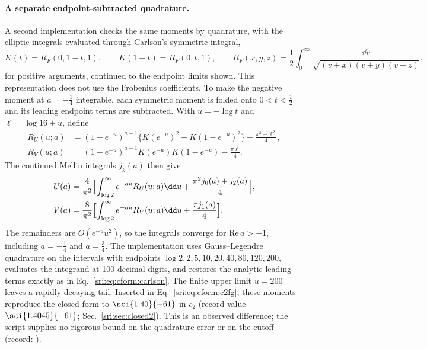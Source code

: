 \paragraph{A separate endpoint-subtracted quadrature.} A second implementation checks the same moments by quadrature,
with the elliptic integrals evaluated through Carlson's symmetric integral,
\begin{equation}
 K(t)=R_F(0,1-t,1),\qquad K(1-t)=R_F(0,t,1),\qquad
 R_F(x,y,z)=\frac12\int_0^\infty\frac{\dd v}{\sqrt{(v+x)(v+y)(v+z)}},
\end{equation}
for positive arguments, continued to the endpoint limits shown. This representation does not use the Frobenius
coefficients. To make the negative moment at $a=-\frac14$ integrable, each symmetric moment is folded onto
$0<t<\frac12$ and its leading endpoint terms are subtracted. With $u=-\log t$ and $\ell=\log16+u$, define
\begin{equation}
\begin{aligned}
 R_U(u;a)&=(1-e^{-u})^{a-1}\bigl\{K(e^{-u})^2+K(1-e^{-u})^2\bigr\}-\frac{\pi^2+\ell^2}{4},\\
 R_V(u;a)&=(1-e^{-u})^{a-1}K(e^{-u})K(1-e^{-u})-\frac{\pi\ell}{4}.
\end{aligned}
\end{equation}
The continued Mellin integrals $j_k(a)$ then give
\begin{equation}
\begin{aligned}
 U(a)&=\frac4{\pi^2}\Bigl[\int_{\log2}^\infty e^{-au}R_U(u;a)\dd u+\frac{\pi^2j_0(a)+j_2(a)}{4}\Bigr],\\
 V(a)&=\frac8{\pi^2}\Bigl[\int_{\log2}^\infty e^{-au}R_V(u;a)\dd u+\frac{\pi j_1(a)}{4}\Bigr].
\end{aligned}
 \label{sri:eq:cform:carlson}
\end{equation}
The remainders are $O(e^{-u}u^2)$, so the integrals converge for $\mathrm{Re}\,a>-1$, including $a=-\frac14$ and
$a=\frac34$. The implementation uses Gauss--Legendre quadrature on the intervals with endpoints
$\log2,2,5,10,20,40,80,120,200$, evaluates the integrand at 100 decimal digits, and restores the analytic leading terms
exactly as in Eq.~\eqref{sri:eq:cform:carlson}. The finite upper limit $u=200$ leaves a rapidly decaying tail. Inserted in
Eq.~\eqref{sri:eq:cform:c2fg}, these moments reproduce the closed form to $\sci{1.40}{-61}$ in $c_2$ (record value
$\sci{1.4045}{-61}$; Sec.~\ref{sri:sec:closed2}). This is an observed difference; the script supplies no rigorous bound on
the quadrature error or on the cutoff (record: ).

